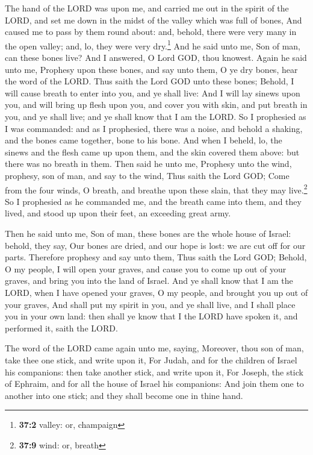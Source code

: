  The hand of the LORD was upon me, and carried me out in
the spirit of the LORD, and set me down in the midst of the valley which
was full of bones,  And caused me to pass by them round
about: and, behold, there were very many in the open valley; and, lo,
they were very dry.\footnote{\textbf{37:2} valley: or, champaign}
 And he said unto me, Son of man, can these bones live?
And I answered, O Lord GOD, thou knowest.  Again he said
unto me, Prophesy upon these bones, and say unto them, O ye dry bones,
hear the word of the LORD.  Thus saith the Lord GOD unto
these bones; Behold, I will cause breath to enter into you, and ye shall
live:  And I will lay sinews upon you, and will bring up
flesh upon you, and cover you with skin, and put breath in you, and ye
shall live; and ye shall know that I am the LORD.  So I
prophesied as I was commanded: and as I prophesied, there was a noise,
and behold a shaking, and the bones came together, bone to his bone.
 And when I beheld, lo, the sinews and the flesh came up
upon them, and the skin covered them above: but there was no breath in
them.  Then said he unto me, Prophesy unto the wind,
prophesy, son of man, and say to the wind, Thus saith the Lord GOD; Come
from the four winds, O breath, and breathe upon these slain, that they
may live.\footnote{\textbf{37:9} wind: or, breath}  So I
prophesied as he commanded me, and the breath came into them, and they
lived, and stood up upon their feet, an exceeding great army.

 Then he said unto me, Son of man, these bones are the
whole house of Israel: behold, they say, Our bones are dried, and our
hope is lost: we are cut off for our parts.  Therefore
prophesy and say unto them, Thus saith the Lord GOD; Behold, O my
people, I will open your graves, and cause you to come up out of your
graves, and bring you into the land of Israel.  And ye
shall know that I am the LORD, when I have opened your graves, O my
people, and brought you up out of your graves,  And shall
put my spirit in you, and ye shall live, and I shall place you in your
own land: then shall ye know that I the LORD have spoken it, and
performed it, saith the LORD.

 The word of the LORD came again unto me, saying,
 Moreover, thou son of man, take thee one stick, and
write upon it, For Judah, and for the children of Israel his companions:
then take another stick, and write upon it, For Joseph, the stick of
Ephraim, and for all the house of Israel his companions: 
And join them one to another into one stick; and they shall become one
in thine hand.

